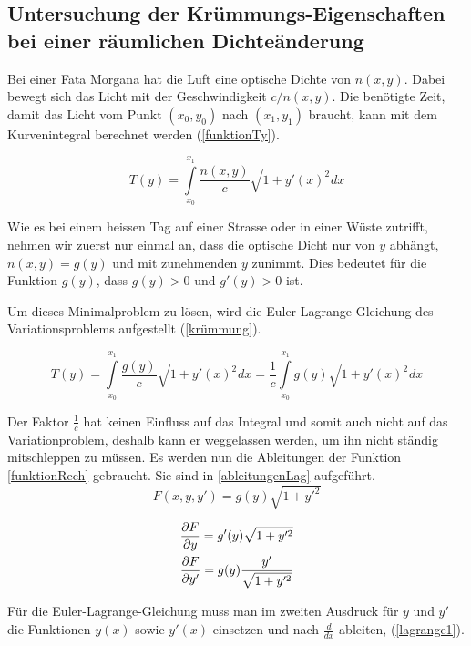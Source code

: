 \subsection{Untersuchung der Krümmungs-Eigenschaften bei einer räumlichen Dichteänderung \label{sec:Krümmung}}

Bei einer Fata Morgana hat die Luft eine optische Dichte von $n(x,y)$. 
Dabei bewegt sich das Licht mit der Geschwindigkeit $c/n(x,y)$. 
Die benötigte Zeit, damit das Licht vom Punkt $(x_0, y_0)$ nach $(x_1, y_1)$ braucht,
kann mit dem Kurvenintegral berechnet werden (\eqref{funktionTy}).

\begin{equation}
	T(y) = \int \limits_{x_0}^{x_1} \frac{n(x,y)}{c} \sqrt{1 + y'(x)^2} dx
	\label{funktionTy}
\end{equation}

Wie es bei einem heissen Tag auf einer Strasse oder in einer Wüste zutrifft,
nehmen wir zuerst nur einmal an, dass die optische Dicht nur von $y$ abhängt,
$n(x,y) = g(y)$ und mit zunehmenden $y$ zunimmt.
Dies bedeutet für die Funktion $g(y)$, dass $g(y) > 0$ und $g'(y) > 0 $ ist.

Um dieses Minimalproblem zu lösen, wird die Euler-Lagrange-Gleichung des Variationsproblems aufgestellt (\eqref{krümmung}).

\begin{equation}
	T(y) = \int \limits_{x_0}^{x_1} \frac{g(y)}{c} \sqrt{1 + y'(x)^2} dx = \frac{1}{c} \int \limits_{x_0}^{x_1} g(y) \sqrt{1 + y'(x)^2} dx
	\label{krümmung}
\end{equation}

Der Faktor $\frac{1}{c}$ hat keinen Einfluss auf das Integral und somit auch nicht auf das Variationproblem, deshalb kann er weggelassen werden, um ihn nicht ständig mitschleppen zu müssen.
Es werden nun die Ableitungen der Funktion \ref{funktionRech} gebraucht. Sie sind in \ref{ableitungenLag} aufgeführt.
\begin{equation}
	F(x,y,y') = g(y) \sqrt{1 + y'^2}
	\label{funktionRech}
\end{equation}

\begin{align}
	\frac{\partial F}{\partial y} = g'(y) \sqrt{1 + y'^2} \notag \\
	\frac{\partial F}{\partial y'} = g(y) \frac{y'}{\sqrt{1 + y'^2}}
	\label{ableitungenLag}
\end{align}

Für die Euler-Lagrange-Gleichung muss man im zweiten Ausdruck für $y$ und $y'$ die Funktionen $y(x)$ 
sowie $y'(x)$ einsetzen und nach $\frac{d}{dx}$ ableiten, (\eqref{lagrange1}).

